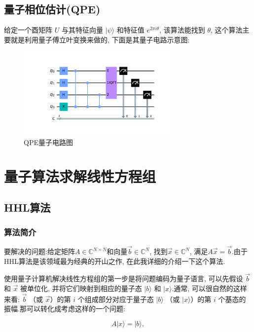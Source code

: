 \section{量子相位估计(QPE)}
给定一个酉矩阵 $U$ 与其特征向量 $|\psi\rangle$ 和特征值 $e^{2\pi i\theta}$, 该算法能找到 $\theta$\cite{23}, 这个算法主要就是利用量子傅立叶变换来做的, 下面是其量子电路示意图:
\begin{figure}[h]
	\centering
	\includegraphics[width=0.7\textwidth]{qpe.pdf}
	\caption{QPE量子电路图}
	\label{fig:qpe}
\end{figure}




\chapter{量子算法求解线性方程组}

\section{HHL算法}
\subsection{算法简介}
要解决的问题:给定矩阵$A\in\mathbb{C}^{N\times N}$和向量$\vec{b}\in\mathbb{C}^{N}$, 找到$\vec{x}\in\mathbb{C}^{N}$, 满足$A\vec{x}=\vec{b}$.由于HHL算法\cite{16}\cite{24}是该领域最为经典的开山之作, 在此我详细的介绍一下这个算法.\par

使用量子计算机解决线性方程组的第一步是将问题编码为量子语言, 可以先假设 $\vec{b}$ 和 $\vec{x}$ 被单位化, 并将它们映射到相应的量子态 $|b\rangle$ 和 $|x\rangle$.通常, 可以很自然的这样来看: $\vec{b}$ （或 $\vec{x}$）的第 $i$ 个组成部分对应于量子态 $|b\rangle$ （或 $|x\rangle$）的第 $i$ 个基态的振幅.那可以转化成考虑这样的一个问题:

\begin{equation}
	A|x\rangle = |b\rangle ,
\end{equation}

